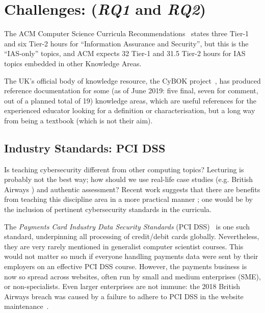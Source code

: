\documentclass[conference]{IEEEtran}
\begin{document}
\section{Challenges: ({\emph{RQ1}} and {\emph{RQ2}})}

The ACM Computer Science Curricula Recommendations~\cite{ACM2013a} states three Tier-1 and six Tier-2 hours for ``Information Assurance and Security'', but this is the ``IAS-only'' topics, and ACM expects 32 Tier-1 and 31.5 Tier-2 hours for IAS topics embedded in other Knowledge Areas.

The UK's official body of knowledge resource, the CyBOK project~\cite{Bristol2019a}, has produced reference documentation for some (as of June 2019: five final, seven for comment, out of a planned total of 19) knowledge areas, which are useful references for the experienced educator looking for a definition or characterisation, but a long way from being a textbook (which is not their aim). 


\subsection{Industry Standards: PCI DSS}\label{sec:PCIDSS}

Is teaching cybersecurity different from other computing topics? Lecturing is probably not the best way; how should we use real-life case studies (e.g. British Airways \cite{Barth2018a}) and authentic assessment? Recent work suggests that there are benefits from teaching this discipline area in a more practical manner \cite{Weiss:2013:THC:2527148.2527180}; one would be by the inclusion of pertinent cybersecurity standards in the curricula.

The {\emph{Payments Card Industry Data Security Standards}} (PCI DSS)~\cite{PCI2018b} is one such standard, underpinning all processing of credit/debit cards globally. Nevertheless, they are very rarely mentioned in generalist computer scientist courses. This would not matter so much if everyone handling payments data were sent by their employers on an effective PCI DSS course. However, the payments business is now so spread across websites, often run by small and medium enterprises (SME), or non-specialists.  Even larger enterprises are not immune: the 2018 British Airways breach was caused by a failure to adhere to PCI DSS in the website maintenance~\cite{Barth2018a}. 
\end{document}
